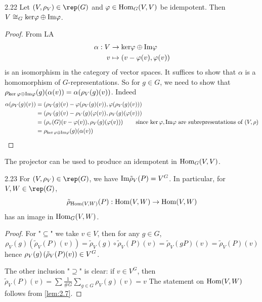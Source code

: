 \documentclass[twoside = false,	%
		headsepline,		%
		parskip = true,
		]{scrbook}						%
\begin{document}
    \begin{lemma}{}{2.22}
        Let $(V,\rho_V) \in \rep(G)$ and $\varphi\in\mathrm{Hom}_G(V,V)$ be idempotent. Then $V\cong_G\mathrm{ker}\varphi\oplus\mathrm{Im}\varphi$.
    \end{lemma}
    \begin{proof}
        From LA
        \begin{equation*}
        \begin{split}
            \alpha: V &\to \mathrm{ker}\varphi\oplus\mathrm{Im}\varphi \\
            v &\mapsto \left( v-\varphi(v), \varphi(v)\right)
        \end{split}
        \end{equation*}
        is an isomorphism in the category of vector spaces. It suffices to show that $\alpha$ is a homomorphism of $G$-representations. So for $g\in G$, we need to show that
        $\rho_{\ker\varphi\oplus\mathrm{Im}\varphi}(g)(\alpha(v))= \alpha(\rho_V(g)(v))$. 
        Indeed
        \begin{align*}
            \alpha(\rho_V(g)(v))&=\left( \rho_V(g)(v)-\varphi(\rho_V(g)(v)), \varphi(\rho_V(g)(v))\right)\\
            &=\left( \rho_V(g)(v)-\rho_V(g)(\varphi(v)), \rho_V(g)(\varphi(v))\right)\\
            &=\left( \rho_v(G)(v-\varphi(v)),\rho_V(g)(\varphi(v))\right)\qquad \text{since $\ker\varphi, \mathrm{Im}\varphi$ are subrepresentations of $(V,\rho)$}\\
            &= \rho_{\ker\varphi\oplus\mathrm{Im}\varphi}(g)(\alpha(v))
        \end{align*}
    \end{proof}

    The projector can be used to produce an idempotent in $\mathrm{Hom}_G(V,V)$.

    \begin{corollary}{}{2.23}
        For $(V,\rho_V) \in\rep(G)$, we have $\mathrm{Im}\tilde\rho_V(P)=V^G$.
        In particular, for $V,W\in\rep(G)$, 
        $$\tilde\rho_{\mathrm{Hom}(V,W)}(P): \mathrm{Hom}(V,W)\to \mathrm{Hom}(V,W)$$ has an image in $\mathrm{Hom}_G(V,W)$.
    \end{corollary}
    \begin{proof}
        For "$\subseteq$" we take $v\in V$, then for any $g\in G$,
        $$\rho_V(g)(\tilde\rho_V(P)(v)) = \tilde{\rho}_V(g) \circ \tilde{\rho}_V(P)(v) = \tilde\rho_V(gP)(v) = \tilde\rho_V(P)(v)$$
        hence $\rho_V(g)\left( \tilde\rho_V(P)(v)\right)\in V^G$.
        
        The other inclusion "$\supseteq$" is clear: if $v\in V^G$, then $\tilde\rho_V(P)(v)=\sum\frac1{\#G}\sum_{g\in G}\rho_V(g)(v)=v$
        The statement on $\mathrm{Hom}(V,W)$ follows from \ref{lem:2.7}.
    \end{proof}
\end{document}
